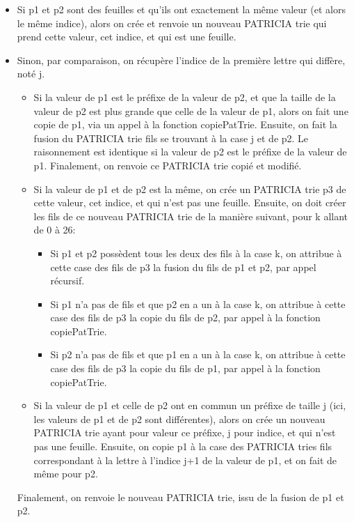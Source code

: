 \documentclass[a4paper,12pt]{report}
\begin{document}
\begin{itemize}
\item Si p1 et p2 sont des feuilles et qu'ils ont exactement la même valeur (et alors le même indice), alors on crée et renvoie un nouveau PATRICIA trie qui prend cette valeur, cet indice, et qui est une feuille.

\item Sinon, par comparaison, on récupère l'indice de la première lettre qui diffère, noté j.
	\begin{itemize}
	\item Si la valeur de p1 est le préfixe de la valeur de p2, et que la taille de la valeur de p2 est plus grande que celle de la valeur de p1, alors on fait une copie de p1, via un appel à la fonction copiePatTrie. Ensuite, on fait la fusion du PATRICIA trie fils se trouvant à la case j et de p2. Le raisonnement est identique si la valeur de p2 est le préfixe de la valeur de p1. Finalement, on renvoie ce PATRICIA trie copié et modifié.

	\item Si la valeur de p1 et de p2 est la même, on crée un PATRICIA trie p3 de cette valeur, cet indice, et qui n'est pas une feuille. Ensuite, on doit créer les fils de ce nouveau PATRICIA trie de la manière suivant, pour k allant de 0 à 26: 
	\begin{itemize}
	\item Si p1 et p2 possèdent tous les deux des fils à la case k, on attribue à cette case des fils de p3 la fusion du fils de p1 et p2, par appel récursif.
	\item Si p1 n'a pas de fils et que p2 en a un à la case k, on attribue à cette case des fils de p3 la copie du fils de p2, par appel à la fonction copiePatTrie.
	\item Si p2 n'a pas de fils et que p1 en a un à la case k, on attribue à cette case des fils de p3 la copie du fils de p1, par appel à la fonction copiePatTrie.
	\end{itemize}
	
	\item Si la valeur de p1 et celle de p2 ont en commun un préfixe de taille j (ici, les valeurs de p1 et de p2 sont différentes), alors on crée un nouveau PATRICIA trie ayant pour valeur ce préfixe, j pour indice, et qui n'est pas une feuille. Ensuite, on copie p1 à la case des PATRICIA tries fils correspondant à la lettre à l'indice j+1 de la valeur de p1, et on fait de même pour p2.
	
	\end{itemize}
Finalement, on renvoie le nouveau PATRICIA trie, issu de la fusion de p1 et p2.
\end{itemize}
\end{document}
